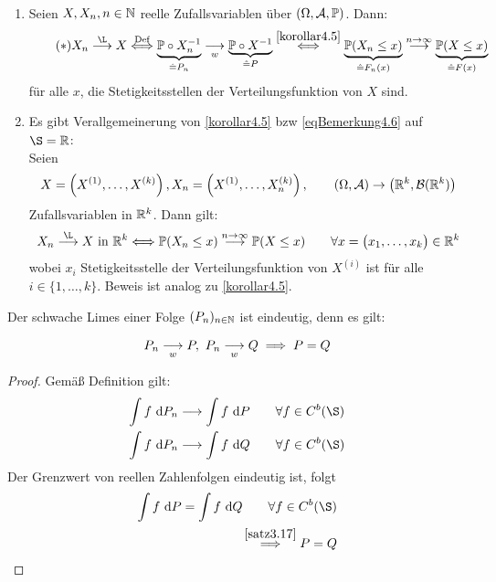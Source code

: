 \begin{bemerkung}\ %
\begin{enumerate}[label=(\arabic*)]
\item Seien $X,X_n,n\in\mathbb{N}$ reelle Zufallsvariablen über $(\Omega,\mathcal{A},\mathbb{P})$. Dann:
\begin{align}\label{eqBemerkung4.6}\tag{$\ast$} 
X_n\stackrel{\L}{\longrightarrow} X
\stackrel{\text{Def}}{\Longleftrightarrow}
\underbrace{\P\circ X_n^{-1}}_{\hat{=}P_n}
\stackrelnew{w}{}{\longrightarrow} \underbrace{\P\circ X^{-1}}_{\hat{=}P}
\stackrel{\ref{korollar4.5}}{\Longleftrightarrow}
\underbrace{\P(X_n\leq x)}_{\hat{=}F_n(x)}
\stackrel{n\to\infty}{\longrightarrow}
\underbrace{\P(X\leq x)}_{\hat{=}F(x)}
\end{align}
für alle $x$, die Stetigkeitsstellen der Verteilungsfunktion von $X$ sind.
\item Es gibt Verallgemeinerung von \ref{korollar4.5} bzw \eqref{eqBemerkung4.6} auf $\S=\R$:\\
Seien 
\begin{align*}
X=\left(X^{(1)},\ldots, X^{(k)}\right),X_n=\left(X^{(1)},\ldots,X^{(k)}_n\right),\qquad(\Omega,\mathcal{A})\to\left(\mathbb{R}^k,\mathcal{B}(\mathbb{R}^k)\right)
\end{align*}
Zufallsvariablen in $\mathbb{R}^k$. Dann gilt:
\begin{align*}
X_n\stackrel{\L}{\longrightarrow} X\text{ in }\R^k
\Longleftrightarrow
\P(X_n\leq x)\stackrel{n\to\infty}{\longrightarrow}\P(X\leq x)\qquad\forall x=\big(x_1,\ldots,x_k\big)\in\R^k
\end{align*}
wobei $x_i$ Stetigkeitsstelle der Verteilungsfunktion von $X^{(i)}$ ist für alle $i\in\lbrace1,\ldots,k\rbrace$. Beweis ist analog zu \ref{korollar4.5}.
\end{enumerate}
\end{bemerkung}

Der schwache Limes einer Folge $(P_n)_{n\in\mathbb{N}}$ ist eindeutig, denn es gilt:

\begin{lemma}\label{lemma4.6Einhalb}
\begin{align*}
P_n\underset{w}{\overset{}{\longrightarrow}} P,~P_n\underset{w}{\overset{}{\longrightarrow}} Q\implies P=Q
\end{align*}
\end{lemma}
\begin{proof}
Gemäß Definition gilt:
\begin{align*}
\int\limits f\d P_n&\stackrel{}{\longrightarrow}\int\limits f\d P\qquad\forall f\in C^b(\S)\\
\int\limits f\d P_n&\stackrel{}{\longrightarrow}\int\limits f\d Q\qquad\forall f\in C^b(\S)
\end{align*}
Der Grenzwert von reellen Zahlenfolgen eindeutig ist, folgt
\begin{align*}
\int\limits f\d P=\int\limits f\d Q\qquad\forall f\in C^b(\S)\\
\stackrel{\ref{satz3.17}}{\implies}
P=Q
\end{align*}
\end{proof}

